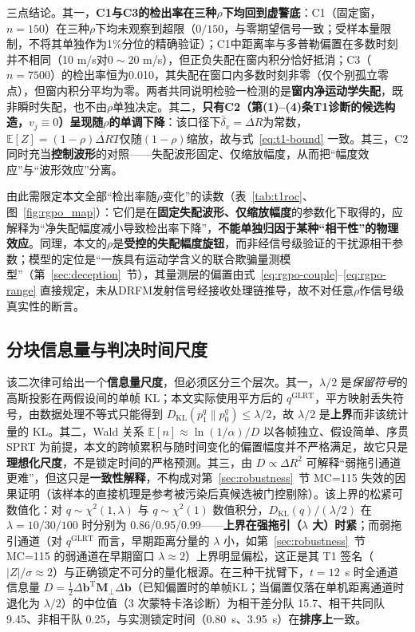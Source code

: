\documentclass[UTF8,a4paper,zihao=-4]{ctexart}
\begin{document}
三点结论。其一，\textbf{C1与C3的检出率在三种\(\rho\)下均回到虚警底}：C1（固定窗，\(n=150\)）在三种\(\rho\)下均未观察到超限（\(0/150\)，与零期望信号一致；受样本量限制，不将其单独作为1\%分位的精确验证）；C1中距离率与多普勒偏置在多数时刻并不相同（10 m/s对\(0\sim20\) m/s），但正负失配在窗内积分恰好抵消；C3（\(n=7500\)）的检出率恒为0.010，其失配在窗口内多数时刻非零（仅个别孤立零点），但窗内积分平均为零。两者共同说明检验一检测的是\textbf{窗内净运动学失配}，既非瞬时失配，也不由\(\rho\)单独决定。其二，\textbf{只有C2（第(1)--(4)条T1诊断的候选构造，\(v_j\equiv0\)）呈现随\(\rho\)的单调下降}：该口径下\(\bar\delta_v=\dot{\Delta R}\)为常数，\(\mathbb E[Z]=(1-\rho)\dot{\Delta R}T\)仅随\((1-\rho)\)缩放，故与式~\eqref{eq:t1-bound} 一致。其三，C2同时充当\textbf{控制波形}的对照——失配波形固定、仅缩放幅度，从而把“幅度效应”与“波形效应”分离。

由此需限定本文全部“检出率随\(\rho\)变化”的读数（表~\ref{tab:t1roc}、图~\ref{fig:rgpo_map}）：它们是在\textbf{固定失配波形、仅缩放幅度}的参数化下取得的，应解释为“净失配幅度减小导致检出率下降”，\textbf{不能单独归因于某种“相干性”的物理效应}。同理，本文的\(\rho\)是\textbf{受控的失配幅度旋钮}，而非经信号级验证的干扰源相干参数；模型的定位是“一族具有运动学含义的联合欺骗量测模型”（第~\ref{sec:deception}~节），其量测层的偏置由式~\eqref{eq:rgpo-couple}--\eqref{eq:rgpo-range} 直接规定，未从DRFM发射信号经接收处理链推导，故不对任意\(\rho\)作信号级真实性的断言。



\subsection{分块信息量与判决时间尺度}\label{sup:information}
该二次律可给出一个\textbf{信息量尺度}，但必须区分三个层次。其一，\(\lambda/2\) 是\emph{保留符号}的高斯投影在两假设间的单帧 KL；本文实际使用平方后的 \(q^{\mathrm{GLRT}}\)，平方映射丢失符号，由数据处理不等式只能得到 \(D_{\mathrm{KL}}(p_1^q\|p_0^q)\le\lambda/2\)，故 \(\lambda/2\) 是\textbf{上界}而非该统计量的 KL。其二，Wald 关系 \(\mathbb E[n]\approx\ln(1/\alpha)/D\) 以各帧独立、假设简单、序贯 SPRT 为前提，本文的跨帧累积与随时间变化的偏置幅度并不严格满足，故它只是\textbf{理想化尺度}，不是锁定时间的严格预测。其三，由 \(D\propto\Delta R^2\) 可解释“弱拖引通道更难”，但这只是\textbf{一致性解释}，不构成对第~\ref{sec:robustness}~节 MC=115 失效的因果证明（该样本的直接机理是参考被污染后真候选被门控剔除）。该上界的松紧可数值化：对 \(q\sim\chi^2(1,\lambda)\) 与 \(q\sim\chi^2(1)\) 数值积分，\(D_{\mathrm{KL}}(q)/(\lambda/2)\) 在 \(\lambda=10/30/100\) 时分别为 0.86/0.95/0.99——\textbf{上界在强拖引（\(\lambda\) 大）时紧}；而弱拖引通道（对 \(q^{\mathrm{GLRT}}\) 而言，早期距离分量的 \(\lambda\) 小，如第~\ref{sec:robustness}~节 MC=115 的弱通道在早期窗口 \(\lambda\approx2\)）上界明显偏松，这正是其 T1 签名（\(|Z|/\sigma\approx2\)）与正确锁定不可分的量化根源。在三种干扰臂下，\(t=12\)~s 时全通道信息量 \(D=\tfrac12\Delta\boldsymbol b^{\mathrm T}\boldsymbol M_\perp\Delta\boldsymbol b\)（已知偏置时的单帧KL；当偏置仅落在单机距离通道时退化为 \(\lambda/2\)）的中位值（3 次蒙特卡洛诊断）为相干差分队 15.7、相干共同队 9.45、非相干队 0.25，与实测锁定时间（0.80~s、3.95~s）在\textbf{排序上}一致。
\end{document}
